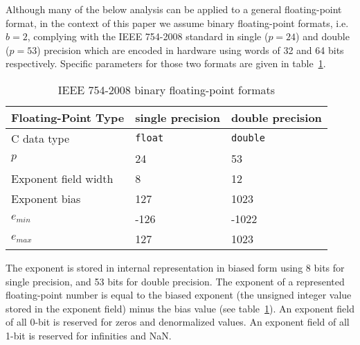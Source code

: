   Although many of the below analysis can be applied to a general floating-point
  format, in the context of this paper we assume binary floating-point formats,
  i.e. $b=2$, complying with the IEEE 754-2008 standard \cite{ieee754}
  in single ($p=24$) and double ($p=53$) precision which are encoded in hardware
  using words of 32 and 64 bits respectively.
  Specific parameters for those two formats are given in table~\ref{tbl:IEEE-754}.
  \begin{table}
    \caption{IEEE 754-2008 binary floating-point formats}
    \label{tbl:IEEE-754}
        \centering
        \begin{tabular}{ | l | l | l | } \hline
            Floating-Point Type & single precision & double precision \\ \hline
            C data type & \texttt{float} & \texttt{double} \\ \hline
            $p$ & 24 & 53 \\ \hline
            Exponent field width & 8 & 12 \\ \hline
            Exponent bias & 127 & 1023 \\ \hline
            $e_{min}$ & -126 & -1022 \\ \hline
            $e_{max}$ & 127 & 1023 \\ \hline
        \end{tabular}
  \end{table}

  \begin{comment}
  Assume that floating point arithmetic complies with the IEEE 754-2008
  standard \cite{ieee754} in some ``to nearest'' rounding mode (no specific tie
  breaking behaviour is required) and that underflow occurs gradually, although
  methods to handle abrupt underflow will be considered in Section
  \ref{sec:indexed_underflow_abrupt}.

  Let $f = sm2^e \in \F$ be a floating-point number represented in IEEE
  754-2008 format \cite{ieee754} where $s \in \{1, -1\}$ is the \textbf{sign},
  $e_{\max} \geq e \geq e_{\min}$ is the \textbf{exponent} ($\exp(f)$ is
  defined to be $e$), $p$ is the \textbf{precision},
  and $m=m_0.m_1m_2...m_{p-1}$ where $m_0, ..., m_{p - 1} \in \{0, 1\}$ is the
  \textbf{significand} of $f$.
  \end{comment}

  The exponent is stored in internal representation in biased form
  using 8 bits for single precision, and 53 bits for double precision.
  The exponent of a represented floating-point number is equal to
  the biased exponent (the unsigned integer value stored in the exponent field)
  minus the bias value (see table~\ref{tbl:IEEE-754}).
  An exponent field of all 0-bit is reserved for zeros and denormalized values.
  An exponent field of all 1-bit is reserved for infinities and NaN.

